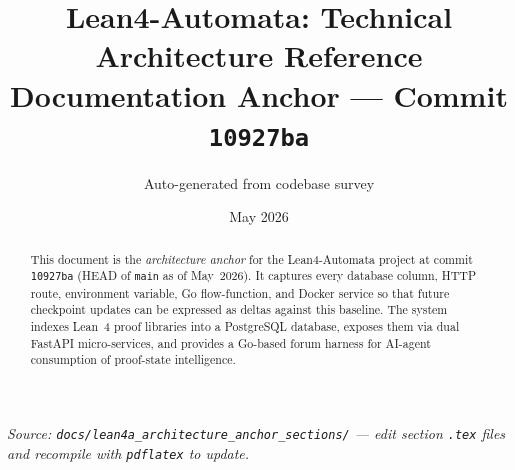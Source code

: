 \documentclass[11pt, a4paper]{article}
\title{%
  \textbf{Lean4-Automata: Technical Architecture Reference}\\[0.5em]
  \large Documentation Anchor --- Commit \texttt{10927ba}%
}
\author{Auto-generated from codebase survey}
\date{May 2026}
\begin{document}
\maketitle
\thispagestyle{empty}

\begin{center}
\small\textit{Source: \texttt{docs/lean4a\_architecture\_anchor\_sections/}
— edit section \texttt{.tex} files and recompile with \texttt{pdflatex} to update.}
\end{center}

\begin{abstract}
This document is the \emph{architecture anchor} for the Lean4-Automata project
at commit \texttt{10927ba} (HEAD of \texttt{main} as of May~2026).  It captures
every database column, HTTP route, environment variable, Go flow-function, and
Docker service so that future checkpoint updates can be expressed as deltas
against this baseline.  The system indexes Lean~4 proof libraries into a
PostgreSQL database, exposes them via dual FastAPI micro-services, and provides
a Go-based forum harness for AI-agent consumption of proof-state intelligence.
\end{abstract}

\tableofcontents
\clearpage



\clearpage


\clearpage


\clearpage


\clearpage


\clearpage


\clearpage


\clearpage


\clearpage


\clearpage


\clearpage


\end{document}
